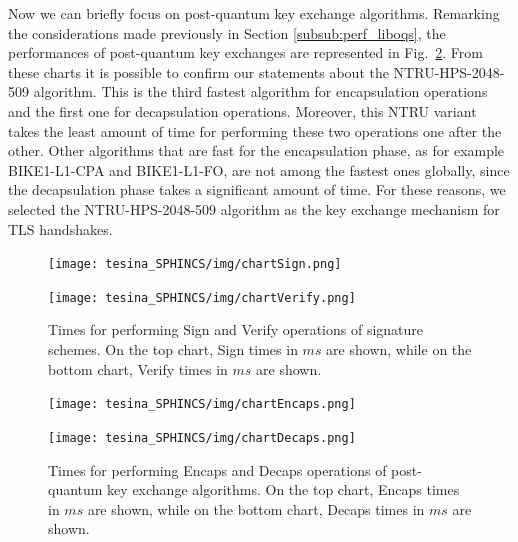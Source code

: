 \documentclass[a4paper,12pt]{article}
\def\myfig#1{Fig.~#1\xspace}
\begin{document}
Now we can briefly focus on post-quantum key exchange algorithms.
Remarking the considerations made previously in Section \ref{subsub:perf_liboqs}, the performances of post-quantum key exchanges are represented in \myfig{\ref{fig:chartED}}. From these charts it is possible to confirm our statements about the NTRU-HPS-2048-509 algorithm. This is the third fastest algorithm for encapsulation operations and the first one for decapsulation operations. 
Moreover, this NTRU variant takes the least amount of time for performing these two operations one after the other.
Other algorithms that are fast for the encapsulation phase, as for example BIKE1-L1-CPA and BIKE1-L1-FO, are not among the fastest ones globally, since the decapsulation phase takes a significant amount of time.
For these reasons, we selected the NTRU-HPS-2048-509 algorithm as the key exchange mechanism for TLS handshakes.

\begin{figure}
\centering
\centerline{\texttt{[image: tesina\_SPHINCS/img/chartSign.png]}}
\centerline{\texttt{[image: tesina\_SPHINCS/img/chartVerify.png]}}
\caption{Times for performing Sign and Verify operations of signature schemes. On the top chart, Sign times in $ms$ are shown, while on the bottom chart, Verify times in $ms$ are shown.}
\label{fig:chartSV}
\end{figure}

\begin{figure}
\centering
\centerline{\texttt{[image: tesina\_SPHINCS/img/chartEncaps.png]}}
\centerline{\texttt{[image: tesina\_SPHINCS/img/chartDecaps.png]}}
\caption{Times for performing Encaps and Decaps operations of post-quantum key exchange algorithms. On the top chart, Encaps times in $ms$ are shown, while on the bottom chart, Decaps times in $ms$ are shown.}
\label{fig:chartED}
\end{figure}
\end{document}

